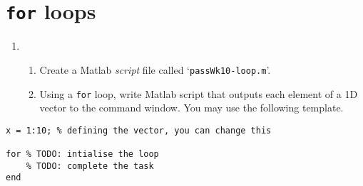 \documentclass{pass}
\begin{document}
\section*{\texttt{for} loops}
\begin{enumerate}[resume]
\item
	\begin{enumerate}
	\item Create a Matlab \textit{script} file called `\texttt{passWk10-loop.m}'.\\
	
	\item Using a \texttt{for} loop, write Matlab script that outputs each element of a 1D vector to the command window. You may use the following template.
	\end{enumerate}
\end{enumerate}
\begin{lstlisting}[style=Matlab]
x = 1:10; % defining the vector, you can change this

for % TODO: intialise the loop
	% TODO: complete the task
end
\end{lstlisting}
\end{document}
